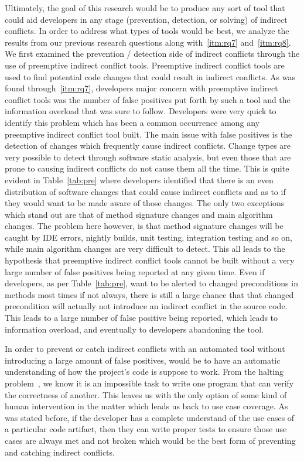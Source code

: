\documentclass[conference]{IEEEtran}
\begin{document}
Ultimately, the goal of this research would be to produce any sort of tool that could aid developers in any stage (prevention, detection, or
solving) of indirect conflicts. In order to address what types of tools would be best, we analyze the results from our previous research
questions along with~\ref{itm:rq7} and~\ref{itm:rq8}. We first examined the prevention / detection side of indirect conflicts through the use of
preemptive indirect conflict tools. Preemptive indirect conflict tools are used to find potential code changes that could result in indirect
conflicts. As was found through~\ref{itm:rq7}, developers major concern with preemptive indirect conflict tools was the number of false positives put
forth by such a tool and the information overload that was sure to follow. Developers were very quick to identify this problem which has
been a common occurrence among any preemptive indirect conflict tool built. The main issue with false positives is the detection of changes
which frequently cause indirect conflicts. Change types are very possible to detect through software static analysis, but even those that are
prone to causing indirect conflicts do not cause them all the time. This is quite evident in Table~\ref{tab:pre} where developers identified
that there is an even distribution of software changes that could cause indirect conflicts and as to if they would want to be made aware of
those changes. The only two exceptions which stand out are that of method signature changes and main algorithm changes. The problem here however,
is that method signature changes will be caught by IDE errors, nightly builds, unit testing, integration testing and so on, while main algorithm
changes are very difficult to detect. This all leads to the hypothesis that preemptive indirect conflict tools cannot be built without a very
large number of false positives being reported at any given time. Even if developers, as per Table~\ref{tab:pre}, want to be alerted to 
changed preconditions in methods most times if not always, there is still a large chance that that changed precondition will actually not
introduce an indirect conflict in the source code. This leads to a large number of false positive being reported, which leads to information
overload, and eventually to developers abandoning the tool.

In order to prevent or catch indirect conflicts with an automated tool without introducing a large amount of false positives, would be to
have an automatic understanding of how the project's code is suppose to work. From the halting problem~\cite{Burkholder:1987}, 
we know it is an impossible task to write one program that can verify the correctness of another. This leaves us with the only option of some kind of
human intervention in the matter which leads us back to use case coverage. As was stated before, if the developer has a complete understand
of the use cases of a particular code artifact, then they can write proper tests to ensure those use cases are always met and not broken which
would be the best form of preventing and catching indirect conflicts.
\end{document}
